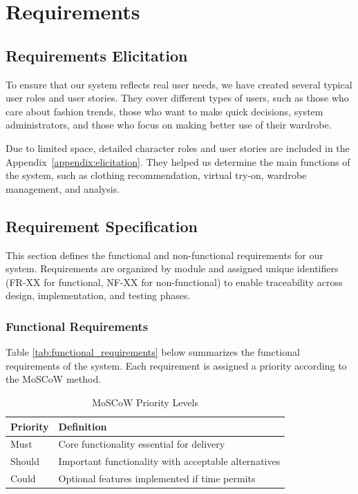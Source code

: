 \chapter{Requirements}
\label{ch:requirements}
\section{Requirements Elicitation}

To ensure that our system reflects real user needs, we have created several typical user roles and user stories. They cover different types of users, such as those who care about fashion trends, those who want to make quick decisions, system administrators, and those who focus on making better use of their wardrobe.

Due to limited space, detailed character roles and user stories are included in the Appendix~\ref{appendix:elicitation}. They helped us determine the main functions of the system, such as clothing recommendation, virtual try-on, wardrobe management, and analysis.

\section{Requirement Specification}
This section defines the functional and non-functional requirements for our system. Requirements are organized by module and assigned unique identifiers (FR-XX for functional, NF-XX for non-functional) to enable traceability across design, implementation, and testing phases.

\subsection{Functional Requirements}
Table \ref{tab:functional_requirements} below summarizes the functional requirements of the system. Each requirement is assigned a priority according to the MoSCoW method.

\begin{table}[h]
\centering
\caption{MoSCoW Priority Levels}
\label{tab:moscow}
\renewcommand{\arraystretch}{1.3} 
\begin{tabular}{lp{10cm}}
\toprule
\textbf{Priority} & \textbf{Definition} \\
\midrule
Must   & Core functionality essential for delivery \\
Should & Important functionality with acceptable alternatives \\
Could  & Optional features implemented if time permits \\
\bottomrule
\end{tabular}
\end{table}


